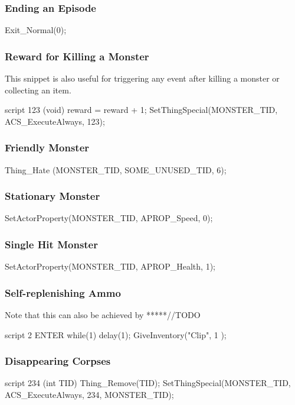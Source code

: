 		\subsubsection*{Ending an Episode}

			\begin{clinee}
Exit_Normal(0);
			\end{clinee}
		\subsubsection*{Reward for Killing a Monster} This snippet is also useful for triggering any event after killing a monster or collecting an item.
			\begin{clinee}
script 123 (void)
{
	reward = reward + 1;
}
SetThingSpecial(MONSTER_TID, ACS_ExecuteAlways, 123);
			\end{clinee}
\subsubsection*{Friendly Monster}
			\begin{clinee}
Thing_Hate (MONSTER_TID, SOME_UNUSED_TID, 6);
			\end{clinee}
		\subsubsection*{Stationary Monster}
			\begin{clinee}
SetActorProperty(MONSTER_TID, APROP_Speed, 0);
			\end{clinee}
		\subsubsection*{Single Hit Monster}
			\begin{clinee}
SetActorProperty(MONSTER_TID, APROP_Health, 1);
			\end{clinee}
		\subsubsection*{Self-replenishing Ammo}
		Note that this can also be achieved by  *****//TODO
			\begin{clinee}
script 2 ENTER
{   
    while(1)
    {
        delay(1);
        GiveInventory("Clip", 1 );
    }
}
			\end{clinee}
		\subsubsection*{Disappearing Corpses}
			\begin{clinee}
script 234 (int TID)
{
	Thing_Remove(TID);
}
SetThingSpecial(MONSTER_TID, ACS_ExecuteAlways, 234, MONSTER_TID);
			\end{clinee}
